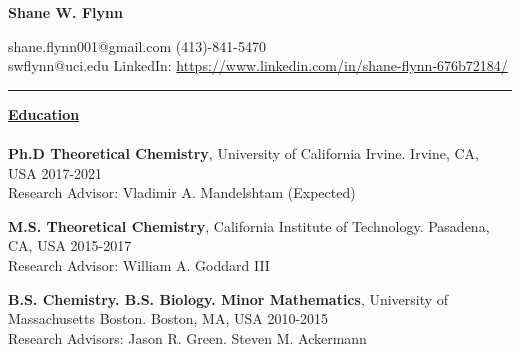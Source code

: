 \documentclass[letterpaper]{article}
\def\name{Shane W. Flynn}
\begin{document}
\centerline{\huge \textbf{\name}}
\vspace{0.1in}
shane.flynn001@gmail.com \hfill (413)-841-5470\\
swflynn@uci.edu \hfill LinkedIn: \url{https://www.linkedin.com/in/shane-flynn-676b72184/}
\hrule
\vspace{0.15in}
{\large \textbf{\underline{Education}}}\\
\vspace{-0.2in}\\

\textbf{Ph.D  Theoretical Chemistry}, University of California Irvine.
Irvine, CA, USA  \hfill 2017-2021\\
Research Advisor: Vladimir A. Mandelshtam \null \hfill (Expected)\\
\vspace{-0.1in}

\textbf{M.S. Theoretical Chemistry}, California Institute of Technology.
Pasadena, CA, USA  \hfill 2015-2017 \\
Research Advisor: William A. Goddard III\\
\vspace{-0.1in}

\textbf{B.S. Chemistry. B.S. Biology. Minor Mathematics}, University of
Massachusetts Boston.
Boston, MA, USA  \hfill 2010-2015 \\
Research Advisors: Jason R. Green. Steven M. Ackermann\\
%
\end{document}
